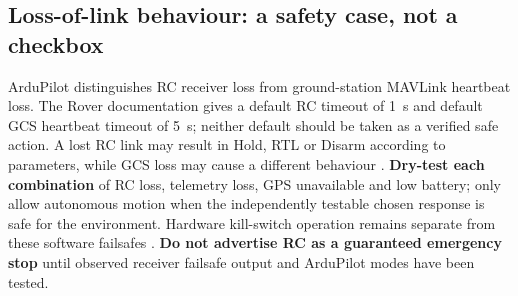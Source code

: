 \subsection{Loss-of-link behaviour: a safety case, not a checkbox}
ArduPilot distinguishes RC receiver loss from ground-station MAVLink heartbeat loss. The Rover documentation gives a default RC timeout of 1~s and default GCS heartbeat timeout of 5~s; neither default should be taken as a verified safe action. A lost RC link may result in Hold, RTL or Disarm according to parameters, while GCS loss may cause a different behaviour \cite{failsafes}. \textbf{Dry-test each combination} of RC loss, telemetry loss, GPS unavailable and low battery; only allow autonomous motion when the independently testable chosen response is safe for the environment. Hardware kill-switch operation remains separate from these software failsafes \cite{failsafes,kill}. \textbf{Do not advertise RC as a guaranteed emergency stop} until observed receiver failsafe output and ArduPilot modes have been tested.

